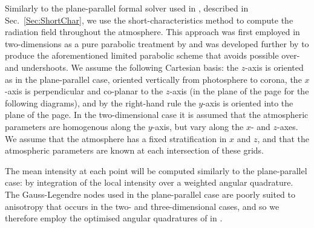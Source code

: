 Similarly to the plane-parallel formal solver used in \Lw{}, described in Sec.~\ref{Sec:ShortChar}, we use the short-characteristics method to compute the radiation field throughout the atmosphere.
This approach was first employed in two-dimensions as a pure parabolic treatment by \citet{Kunasz1988} and was developed further by \citet{Auer1994} to produce the aforementioned limited parabolic scheme that avoids possible over- and undershoots.
We assume the following Cartesian basis: the $z$-axis is oriented as in the plane-parallel case, oriented vertically from photosphere to corona, the $x$-axis is perpendicular and co-planar to the $z$-axis (in the plane of the page for the following diagrams), and by the right-hand rule the $y$-axis is oriented into the plane of the page.
In the two-dimensional case it is assumed that the atmospheric parameters are homogenous along the $y$-axis, but vary along the $x$- and $z$-axes.
We assume that the atmosphere has a fixed stratification in $x$ and $z$, and that the atmospheric parameters are known at each intersection of these grids.

The mean intensity at each point will be computed similarly to the plane-parallel case: by integration of the local intensity over a weighted angular quadrature.
The Gauss-Legendre nodes used in the plane-parallel case are poorly suited to anisotropy that occurs in the two- and three-dimensional cases, and so we therefore employ the optimised angular quadratures of \citet{Stepan2020} in \Lw{}.

